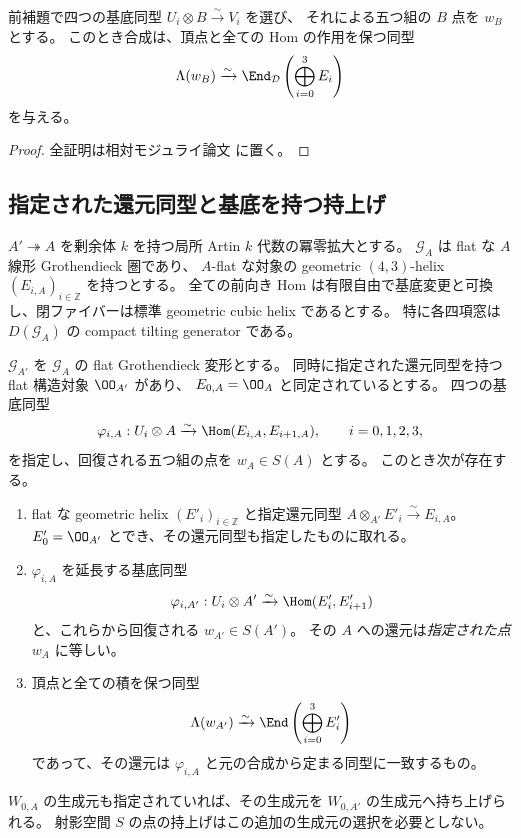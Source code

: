 \begin{corollary}
\label{cor:quintuple-four-window}
前補題で四つの基底同型 $U_i\otimes B\xrightarrow{\sim}V_i$ を選び、
それによる五つ組の $B$ 点を $w_B$ とする。
このとき合成は、頂点と全ての Hom の作用を保つ同型
\[
 \Lambda(w_B)\xrightarrow{\sim}
 \End_{\mathcal D}\left(\bigoplus_{i=0}^3E_i\right)
\]
を与える。
\end{corollary}

\begin{proof}
全証明は相対モジュライ論文 \cite[\texttt{cubic_smooth_atlas}]{QuadricModuli2026} に置く。
\end{proof}

\subsection{指定された還元同型と基底を持つ持上げ}

\begin{proposition}
\label{prop:framed-cubic-artin-lift}
$A'\twoheadrightarrow A$ を剰余体 $k$ を持つ局所 Artin $k$ 代数の冪零拡大とする。
$\mathcal G_A$ は flat な $A$ 線形 Grothendieck 圏であり、
$A$-flat な対象の geometric $(4,3)$-helix $(E_{i,A})_{i\in\mathbb Z}$ を持つとする。
全ての前向き Hom は有限自由で基底変更と可換し、閉ファイバーは標準 geometric cubic helix であるとする。
特に各四項窓は $D(\mathcal G_A)$ の compact tilting generator である。

$\mathcal G_{A'}$ を $\mathcal G_A$ の flat Grothendieck 変形とする。
同時に指定された還元同型を持つ flat 構造対象 $\OO_{A'}$ があり、
$E_{0,A}=\OO_A$ と同定されているとする。
四つの基底同型
\[
 \varphi_{i,A}:U_i\otimes A\xrightarrow{\sim}
 \Hom(E_{i,A},E_{i+1,A}),\qquad i=0,1,2,3,
\]
を指定し、回復される五つ組の点を $w_A\in S(A)$ とする。
このとき次が存在する。
\begin{enumerate}
\item flat な geometric helix $(E'_{i})_{i\in\mathbb Z}$ と指定還元同型
  $A\otimes_{A'}E'_i\xrightarrow{\sim}E_{i,A}$。
  $E'_0=\OO_{A'}$ とでき、その還元同型も指定したものに取れる。
\item $\varphi_{i,A}$ を延長する基底同型
\[
 \varphi_{i,A'}:U_i\otimes A'\xrightarrow{\sim}\Hom(E'_i,E'_{i+1})
\]
と、これらから回復される $w_{A'}\in S(A')$。
その $A$ への還元は\emph{指定された点} $w_A$ に等しい。
\item 頂点と全ての積を保つ同型
\[
 \Lambda(w_{A'})\xrightarrow{\sim}\End\left(\bigoplus_{i=0}^3E'_i\right)
\]
であって、その還元は $\varphi_{i,A}$ と元の合成から定まる同型に一致するもの。
\end{enumerate}
$W_{0,A}$ の生成元も指定されていれば、その生成元を $W_{0,A'}$ の生成元へ持ち上げられる。
射影空間 $S$ の点の持上げはこの追加の生成元の選択を必要としない。
\end{proposition}

